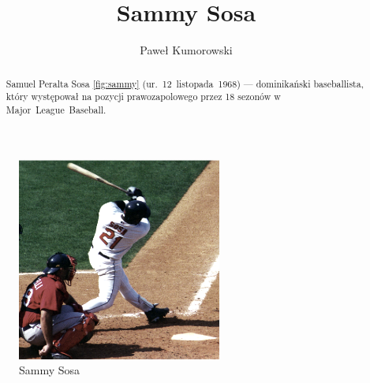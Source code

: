 \documentclass[a4paper,12pt]{article}
\title{Sammy Sosa}
\author{Paweł Kumorowski}
\begin{document}
\maketitle

\begin{figure}[h]
	\centering
		\includegraphics[width=0.6\textwidth]{sosa.eps}
		\caption{Sammy Sosa} \label{fig:sammy}

\end{figure}

\begin{abstract}
Samuel Peralta Sosa \ref{fig:sammy} (ur.~12~listopada~1968) --- dominikański baseballista, który występował na pozycji prawozapolowego przez 18 sezonów w Major~League~Baseball.
\end{abstract}

\tableofcontents
\end{document}
